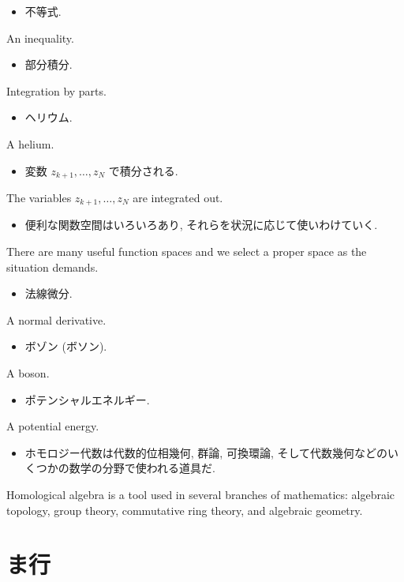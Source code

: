 \documentclass[openany, a4paper, oneside]{jsbook}
\begin{document}
\begin{itemize}
\item 不等式.
\end{itemize}
An inequality.

\begin{itemize}
\item 部分積分.
\end{itemize}
Integration by parts.

\begin{itemize}
\item ヘリウム.
\end{itemize}
A helium.

\begin{itemize}
\item 変数 $z_{k+1}, \dots, z_N$ で積分される. \cite{LiebSeiringer1}
\end{itemize}
The variables $z_{k+1}, \dots, z_N$ are integrated out.

\begin{itemize}
\item 便利な関数空間はいろいろあり, それらを状況に応じて使いわけていく.
\end{itemize}
There are many useful function spaces and we select a proper space as the situation demands.

\begin{itemize}
\item 法線微分.
\end{itemize}
A normal derivative.

\begin{itemize}
\item ボゾン (ボソン). \cite{LiebSeiringer1}
\end{itemize}
A boson.

\begin{itemize}
\item ポテンシャルエネルギー.
\end{itemize}
A potential energy.

\begin{itemize}
\item ホモロジー代数は代数的位相幾何, 群論, 可換環論, そして代数幾何などのいくつかの数学の分野で使われる道具だ. \cite{CharlesWeibel1}
\end{itemize}
Homological algebra is a tool used in several branches of mathematics: algebraic topology, group theory,
commutative ring theory, and algebraic geometry.
\section{ま行}
\end{document}
